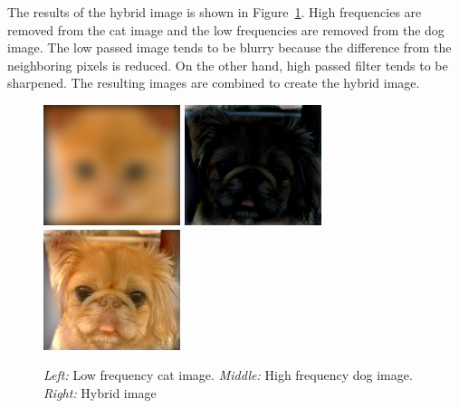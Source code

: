 The results of the hybrid image is shown in Figure~\ref{fig:result2}. High frequencies are removed from the cat image and the low frequencies are removed from the dog image. The low passed image tends to be blurry because the difference from the neighboring pixels is reduced. On the other hand, high passed filter tends to be sharpened. The resulting images are combined to create the hybrid image.
\begin{figure}[h]
	\centering
	\includegraphics[width=4cm]{../code/low.png}
	\includegraphics[width=4cm]{../code/high.png}
	\includegraphics[width=4cm]{../code/hybrid.png}
	\caption{\emph{Left:} Low frequency cat image. \emph{Middle:} High frequency dog image. \emph{Right:} Hybrid image}
	\label{fig:result2}
\end{figure}


